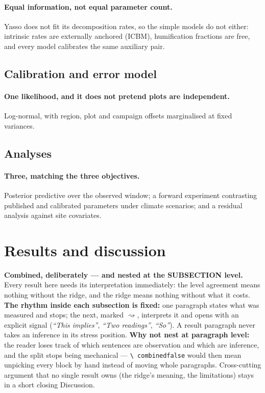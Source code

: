 \documentclass[11pt]{article}
\newif\ifcombined \combinedtrue
\begin{document}
\paragraph{Equal information, not equal parameter count.} Yasso does not fit its decomposition rates,
so the simple models do not either: intrinsic rates are externally anchored (ICBM), humification
fractions are free, and every model calibrates the same auxiliary pair.

\subsection{Calibration and error model}
\paragraph{One likelihood, and it does not pretend plots are independent.} Log-normal, with region,
plot and campaign offsets marginalised at fixed variances.

\subsection{Analyses}
\paragraph{Three, matching the three objectives.} Posterior predictive over the observed window; a
forward experiment contrasting published and calibrated parameters under climate scenarios; and a
residual analysis against site covariates.

\ifcombined
  \section{Results and discussion}
  \begin{note}
  \textbf{Combined, deliberately --- and nested at the SUBSECTION level.} Every result here needs its
  interpretation immediately: the level agreement means nothing without the ridge, and the ridge means
  nothing without what it costs. \textbf{The rhythm inside each subsection is fixed:} one paragraph
  states what was measured and stops; the next, marked \textcolor{noterule}{$\rightsquigarrow$},
  interprets it and opens with an explicit signal (\emph{``This implies''}, \emph{``Two readings''},
  \emph{``So''}). A result paragraph never takes an inference in its stress position.
  \textbf{Why not nest at paragraph level:} the reader loses track of which sentences are observation
  and which are inference, and the split stops being mechanical --- \texttt{\textbackslash
  combinedfalse} would then mean unpicking every block by hand instead of moving whole paragraphs.
  Cross-cutting argument that no single result owns (the ridge's meaning, the limitations) stays in a
  short closing Discussion.
  \end{note}
\else
\end{document}
